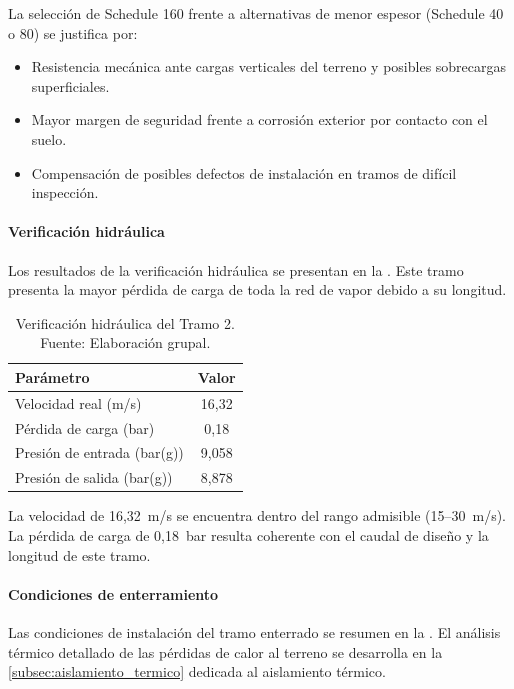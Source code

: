 \documentclass[12pt]{article}
\begin{document}
La selección de Schedule 160 frente a alternativas de menor espesor (Schedule 40 o 80) se justifica por:
\begin{itemize}[noitemsep]
	\item Resistencia mecánica ante cargas verticales del terreno y posibles sobrecargas superficiales.
	\item Mayor margen de seguridad frente a corrosión exterior por contacto con el suelo.
	\item Compensación de posibles defectos de instalación en tramos de difícil inspección.
\end{itemize}

\paragraph{Verificación hidráulica}

Los resultados de la verificación hidráulica se presentan en la . Este tramo presenta la mayor pérdida de carga de toda la red de vapor debido a su longitud.

\begin{table}[H]
	\centering
	\caption{Verificación hidráulica del Tramo 2. Fuente: Elaboración grupal.}
	\label{tab:hidraulica-tramo2}
	\begin{tabular}{lc}
		\toprule
		\textbf{Parámetro}          & \textbf{Valor} \\
		\midrule
		Velocidad real (m/s)        & 16{,}32        \\
		Pérdida de carga (bar)      & 0{,}18         \\
		Presión de entrada (bar(g)) & 9{,}058        \\
		Presión de salida (bar(g))  & 8{,}878        \\
		\bottomrule
	\end{tabular}
\end{table}

La velocidad de 16{,}32~m/s se encuentra dentro del rango admisible (15--30~m/s). La pérdida de carga de 0{,}18~bar resulta coherente con el caudal de diseño y la longitud de este tramo.

\paragraph{Condiciones de enterramiento}

Las condiciones de instalación del tramo enterrado se resumen en la . El análisis térmico detallado de las pérdidas de calor al terreno se desarrolla en la \autoref{subsec:aislamiento_termico} dedicada al aislamiento térmico.
\end{document}
